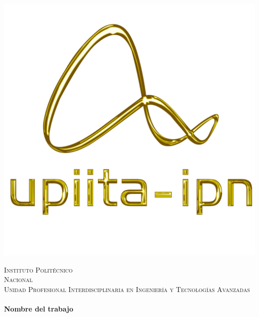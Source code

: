 \begin{center}
	\hfill
	\begin{minipage}{0.48\textwidth}
		\begin{flushright}
		\includegraphics[scale = 0.3]{images/logo_upiita_oro.png}
		\end{flushright}
	\end{minipage}
	
	
	\vspace*{-2.5cm}  %
	
	\textsc{\Huge Instituto Polit\'ecnico\\ \vspace{10pt} Nacional}\\[1.5cm]
	
	\textsc{\huge Unidad Profesional Interdisciplinaria en Ingenier\'ia \vspace{5pt} y Tecnolog\'ias Avanzadas}\\[1.5cm]
	
	
	\HRule \\[0.4cm]
	{ \huge \bfseries Nombre del trabajo}\\[0.4cm]
	\HRule \\[1.5cm]
	

\end{center}
